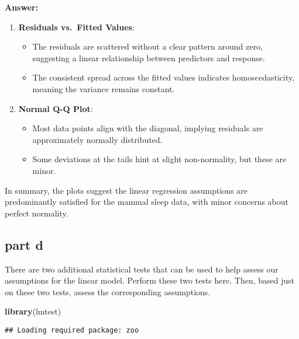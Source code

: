 \documentclass[
]{article}
\newenvironment{Shaded}{\begin{snugshade}}{\end{snugshade}}
\newcommand{\FunctionTok}[1]{\textcolor[rgb]{0.13,0.29,0.53}{\textbf{#1}}}
\newcommand{\NormalTok}[1]{#1}
\providecommand{\tightlist}{%
  \setlength{\itemsep}{0pt}\setlength{\parskip}{0pt}}
\begin{document}
\textbf{Answer:}

\begin{enumerate}
\def\labelenumi{\arabic{enumi}.}
\tightlist
\item
  \textbf{Residuals vs.~Fitted Values}:

  \begin{itemize}
  \tightlist
  \item
    The residuals are scattered without a clear pattern around zero,
    suggesting a linear relationship between predictors and response.
  \item
    The consistent spread across the fitted values indicates
    homoscedasticity, meaning the variance remains constant.
  \end{itemize}
\item
  \textbf{Normal Q-Q Plot}:

  \begin{itemize}
  \tightlist
  \item
    Most data points align with the diagonal, implying residuals are
    approximately normally distributed.
  \item
    Some deviations at the tails hint at slight non-normality, but these
    are minor.
  \end{itemize}
\end{enumerate}

In summary, the plots suggest the linear regression assumptions are
predominantly satisfied for the mammal sleep data, with minor concerns
about perfect normality.

\subsection{part d}\label{part-d-3}

There are two additional statistical tests that can be used to help
assess our assumptions for the linear model. Perform these two tests
here. Then, based just on these two tests, assess the corresponding
assumptions.

\begin{Shaded}
\begin{Highlighting}[]
\FunctionTok{library}\NormalTok{(lmtest)}
\end{Highlighting}
\end{Shaded}

\begin{verbatim}
## Loading required package: zoo
\end{verbatim}
\end{document}
